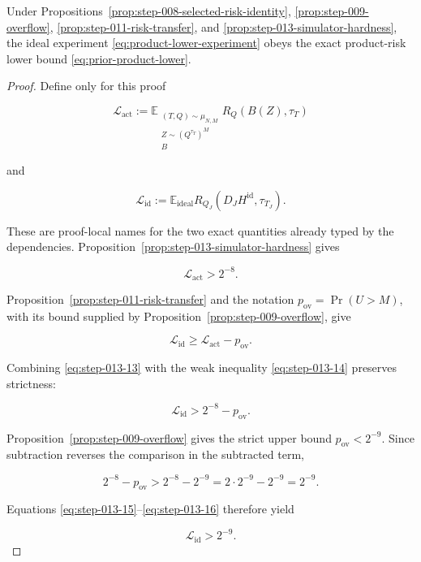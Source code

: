 \begin{proposition}\label{prop:step-013-product-lower-bound}
Under Propositions~\ref{prop:step-008-selected-risk-identity},
\ref{prop:step-009-overflow}, \ref{prop:step-011-risk-transfer}, and
\ref{prop:step-013-simulator-hardness}, the ideal experiment
\eqref{eq:product-lower-experiment} obeys the exact
product-risk lower bound \eqref{eq:prior-product-lower}.
\end{proposition}

\begin{proof}
Define only for this proof

\[
\mathcal L_{\mathrm{act}}
:=
\mathbb E_{\substack{(T,Q)\sim\mu_{N,M}\\
                      Z\sim(Q^{\tau_T})^M\\ B}}
R_Q(B(Z),\tau_T)
\tag{S13.11}\label{eq:step-013-11}
\]

and

\[
\mathcal L_{\mathrm{id}}
:=
\mathbb E_{\mathrm{ideal}}
R_{Q_J}(D_JH^{\mathrm{id}},\tau_{T_J}).
\tag{S13.12}\label{eq:step-013-12}
\]

These are proof-local names for the two exact quantities already typed by
the dependencies. Proposition~\ref{prop:step-013-simulator-hardness}
gives

\[
\mathcal L_{\mathrm{act}}>2^{-8}.
\tag{S13.13}\label{eq:step-013-13}
\]

Proposition~\ref{prop:step-011-risk-transfer} and the notation
\(p_{\mathrm{ov}}=\Pr(U>M)\), with its bound supplied by
Proposition~\ref{prop:step-009-overflow}, give

\[
\mathcal L_{\mathrm{id}}
\ge \mathcal L_{\mathrm{act}}-p_{\mathrm{ov}}.
\tag{S13.14}\label{eq:step-013-14}
\]

Combining \eqref{eq:step-013-13} with the weak inequality \eqref{eq:step-013-14} preserves strictness:

\[
\mathcal L_{\mathrm{id}}
>2^{-8}-p_{\mathrm{ov}}.
\tag{S13.15}\label{eq:step-013-15}
\]

Proposition~\ref{prop:step-009-overflow} gives the strict upper
bound \(p_{\mathrm{ov}}<2^{-9}\). Since subtraction reverses the comparison
in the subtracted term,

\[
2^{-8}-p_{\mathrm{ov}}
>2^{-8}-2^{-9}
=2\cdot2^{-9}-2^{-9}
=2^{-9}.
\tag{S13.16}\label{eq:step-013-16}
\]

Equations \eqref{eq:step-013-15}--\eqref{eq:step-013-16} therefore yield

\[
\mathcal L_{\mathrm{id}}>2^{-9}.
\tag{S13.17}\label{eq:step-013-17}
\]


\end{proof}
